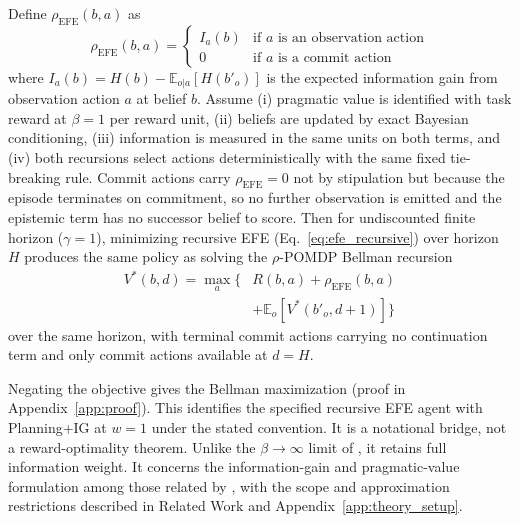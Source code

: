\documentclass[manuscript, screen, review]{jair}
\begin{document}
\begin{proposition}
\label{prop:equivalence}
Define $\rho_{\mathrm{EFE}}(b, a)$ as
\begin{equation*}
    \rho_{\mathrm{EFE}}(b, a) = \begin{cases} I_a(b) & \text{if } a \text{ is an observation action} \\ 0 & \text{if } a \text{ is a commit action} \end{cases}
\end{equation*}
where $I_a(b) = H(b) - \mathbb{E}_{o|a}[H(b'_o)]$ is the expected information gain from observation action $a$ at belief $b$. Assume (i) pragmatic value is identified with task reward at $\beta{=}1$ per reward unit, (ii) beliefs are updated by exact Bayesian conditioning, (iii) information is measured in the same units on both terms, and (iv) both recursions select actions deterministically with the same fixed tie-breaking rule. Commit actions carry $\rho_{\mathrm{EFE}}{=}0$ not by stipulation but because the episode terminates on commitment, so no further observation is emitted and the epistemic term has no successor belief to score. Then for undiscounted finite horizon ($\gamma{=}1$), minimizing recursive EFE (Eq.~\ref{eq:efe_recursive}) over horizon $H$ produces the same policy as solving the $\rho$-POMDP Bellman recursion
\begin{align*}
V^*(b,d)=\max_a\big\{&R(b,a)+\rho_{\mathrm{EFE}}(b,a)\\
&+\mathbb E_o[V^*(b'_o,d+1)]\big\}
\end{align*}
over the same horizon, with terminal commit actions carrying no continuation term and only commit actions available at $d=H$.
\end{proposition}

Negating the objective gives the Bellman maximization (proof in Appendix~\ref{app:proof}). This identifies the specified recursive EFE agent with Planning+IG at $w=1$ under the stated convention. It is a notational bridge, not a reward-optimality theorem. Unlike the $\beta\to\infty$ limit of \citet{dacosta2020b}, it retains full information weight. It concerns the information-gain and pragmatic-value formulation among those related by \citet{champion2024}, with the scope and approximation restrictions described in Related Work and Appendix~\ref{app:theory_setup}.
\end{document}
